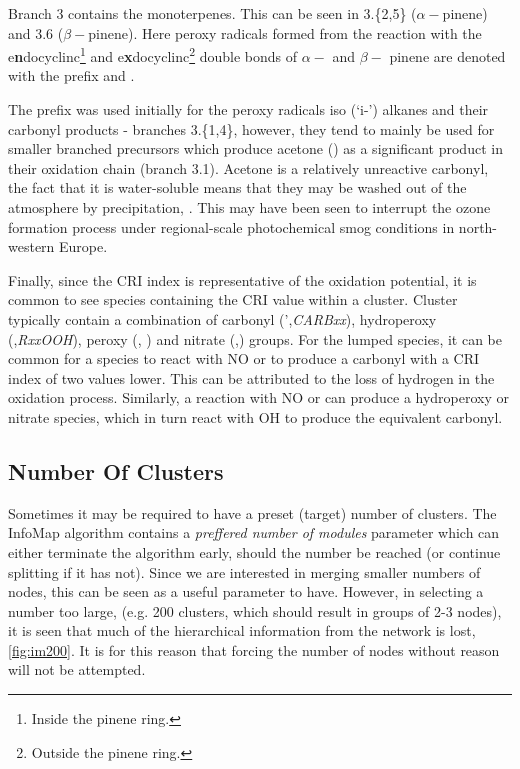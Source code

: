 Branch 3 contains the monoterpenes. This can be seen in 3.\{2,5\} ($\alpha-$pinene) and 3.6 ($\beta-$pinene). Here peroxy radicals formed from the reaction with the e\textbf{n}docyclinc\footnote{Inside the pinene ring.} and e\textbf{x}docyclinc\footnote{Outside the pinene ring.} double bonds of $\alpha-$ and $\beta-$ pinene are denoted with the prefix \emph{} and \emph{}.

The \emph{} prefix was used initially for the peroxy radicals iso (`i-') alkanes and their carbonyl products - branches 3.\{1,4\}, however, they tend to mainly be used for smaller branched precursors which produce acetone () as a significant product in their oxidation chain (branch 3.1). Acetone is a relatively unreactive carbonyl, the fact that it is water-soluble means that they may be washed out of the atmosphere by precipitation, \citep{acetonerain}. This may have been seen to interrupt the ozone formation process under regional-scale photochemical smog conditions in north-western Europe.

Finally, since the CRI index is representative of the oxidation potential, it is common to see species containing the CRI value within a cluster. Cluster typically contain a combination of carbonyl (',\emph{CARBxx}), hydroperoxy (,\emph{RxxOOH}), peroxy (, \emph{}) and nitrate (,\emph{}) groups. For the lumped species, it can be common for a  species to react with NO or  to produce a carbonyl with a CRI index of two values lower. This can be attributed to the loss of hydrogen in the oxidation process. Similarly, a reaction with NO or  can produce a hydroperoxy or nitrate species, which in turn react with OH to produce the equivalent carbonyl.
%
%
%
%
%



 \subsection{Number Of Clusters}
Sometimes it may be required to have a preset (target) number of clusters. The InfoMap algorithm contains a \emph{preffered number of modules} parameter which can either terminate the algorithm early, should the number be reached (or continue splitting if it has not). Since we are interested in merging smaller numbers of nodes, this can be seen as a useful parameter to have. However, in selecting a number too large, (e.g. 200 clusters, which should result in groups of 2-3 nodes), it is seen that much of the hierarchical information from the network is lost, \autoref{fig:im200}. It is for this reason that forcing the number of nodes without reason will not be attempted.


